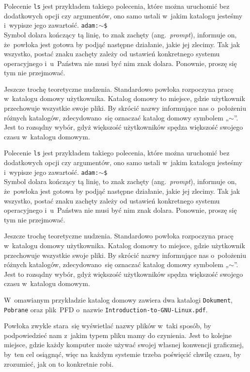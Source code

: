 \documentclass[10pt,t]{beamer}
\begin{document}
\begin{frame}
  Polecenie \texttt{ls} jest przykładem takiego polecenia, które można
  uruchomić bez dodatkowych opcji czy argumentów, ono samo ustali w~jakim
  katalogu jesteśmy i~wypisze jego zawartość.
  \texttt{adam:$\sim$\$} \\
  Symbol dolara kończący tą linię, to znak zachęty (ang.~\textit{prompt}),
  informuje on, że~powłoka jest gotowa by podjąć następne działanie, jakie
  jej zlecimy. Tak jak wszystko, postać znaku zachęty zależy od ustawień
  konkretnego systemu operacyjnego i~u~Państwa nie musi być nim znak dolara.
  Ponownie, proszę się tym nie przejmować.

  Jeszcze trochę teoretyczne nudzenia. Standardowo powłoka rozpoczyna pracę
  w~katalogu domowy użytkownika. Katalog domowy to miejsce, gdzie użytkownik
  przechowuje wszystkie swoje pliki. By skrócić nazwy informujące nas
  o~położeniu różnych katalogów, zdecydowano~się oznaczać katalog domowy
  symbolem „$\sim$”. Jest to rozsądny wybór, gdyż większość użytkowników
  spędza większość swojego czasu w~katalogu domowym.

  Polecenie \texttt{ls} jest przykładem takiego polecenia, które można
  uruchomić bez dodatkowych opcji czy argumentów, ono samo ustali w~jakim
  katalogu jesteśmy i~wypisze jego zawartość.
  \texttt{adam:$\sim$\$} \\
  Symbol dolara kończący tą linię, to znak zachęty (ang.~\textit{prompt}),
  informuje on, że~powłoka jest gotowa by podjąć następne działanie, jakie
  jej zlecimy. Tak jak wszystko, postać znaku zachęty zależy od ustawień
  konkretnego systemu operacyjnego i~u~Państwa nie musi być nim znak dolara.
  Ponownie, proszę się tym nie przejmować.

  Jeszcze trochę teoretyczne nudzenia. Standardowo powłoka rozpoczyna pracę
  w~katalogu domowy użytkownika. Katalog domowy to miejsce, gdzie użytkownik
  przechowuje wszystkie swoje pliki. By skrócić nazwy informujące nas
  o~położeniu różnych katalogów, zdecydowano~się oznaczać katalog domowy
  symbolem „$\sim$”. Jest to rozsądny wybór, gdyż większość użytkowników
  spędza większość swojego czasu w~katalogu domowym.



  W~omawianym przykładzie katalog domowy zawiera dwa katalogi
  \texttt{Dokument}, \texttt{Pobrane} oraz plik~PFD o~nazwie
  \texttt{Introduction-to-GNU-Linux.pdf}.

  Powłoka zwykle stara~się wyświetlać nazwy plików w~taki sposób, by
  podpowiedzieć nam z~jakim typem pliku mamy do czynienia. Jest to kolejne
  miejsce, gdzie każdy komputer może używać swojej własnej konwencji
  graficznej, by~ten cel osiągnąć, więc na każdym systemie trzeba poświęcić
  chwilę czasu, by zrozumieć, jak on to konkretnie robi.


\end{frame}
\end{document}
